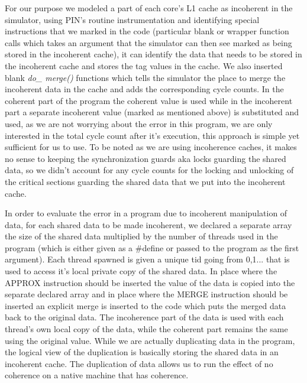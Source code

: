 \documentclass[12pt,conference]{IEEEtran}
\begin{document}
For our purpose we modeled a part of each core's L1 cache as incoherent
in the simulator, using PIN's routine instrumentation and identifying
special instructions that we marked in the code (particular blank or 
wrapper function calls which takes an argument that the simulator can 
then see marked as being stored in the incoherent cache), it can identify 
the data that needs to be stored in the incoherent cache and stores the
tag values in the cache. We also inserted blank \textit{do\_ merge()}
functions which tells the simulator the place to merge the incoherent
data in the cache and adds the corresponding cycle counts. In the 
coherent part of the program the coherent value is used while in the
incoherent part a separate incoherent value (marked as mentioned above)
is substituted and used, as we are not worrying about the error in
this program, we are only interested in the total cycle count after
it's execution, this approach is simple yet sufficient for us to use.
To be noted as we are using incoherence caches, it makes no sense
to keeping the synchronization guards aka locks guarding the shared
data, so we didn't account for any cycle counts for the locking and
unlocking of the critical sections guarding the shared data that
we put into the incoherent cache.

In order to evaluate the error in a program due to incoherent 
manipulation of data, for each shared data to be made incoherent,
we declared a separate array the size of the shared data multiplied
by the number of threads used in the program (which is either given
as a \#define or passed to the program as the first argument). Each 
thread spawned is given a unique tid going from 0,1... that is used
to access it's local private copy of the shared data. In place where
the APPROX instruction should be inserted the value of the data is
copied into the separate declared array and in place where the MERGE
instruction should be inserted an explicit merge is inserted to the
code which puts the merged data back to the original data. The 
incoherence part of the data is used with each thread's own local
copy of the data, while the coherent part remains the same using
the original value. While we are actually duplicating data in 
the program, the logical view of the duplication is basically
storing the shared data in an incoherent cache. The duplication of data
allows us to run the effect of no coherence on a native machine
that has coherence.
\end{document}
